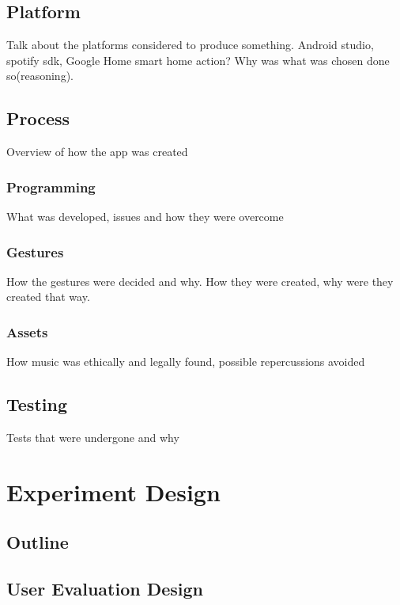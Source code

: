\documentclass{l4proj}
\begin{document}
\section{Platform}
Talk about the platforms considered to produce something. Android studio, spotify sdk, Google Home smart home action? Why was what was chosen done so(reasoning).
\section{Process}
Overview of how the app was created
\subsection{Programming}
What was developed, issues and how they were overcome
\subsection{Gestures}
How the gestures were decided and why. How they were created, why were they created that way.
\subsection{Assets}
How music was ethically and legally found, possible repercussions avoided
\section{Testing}
Tests that were undergone and why



\chapter{Experiment Design}

\section{Outline}

\section{User Evaluation Design}

\end{document}
